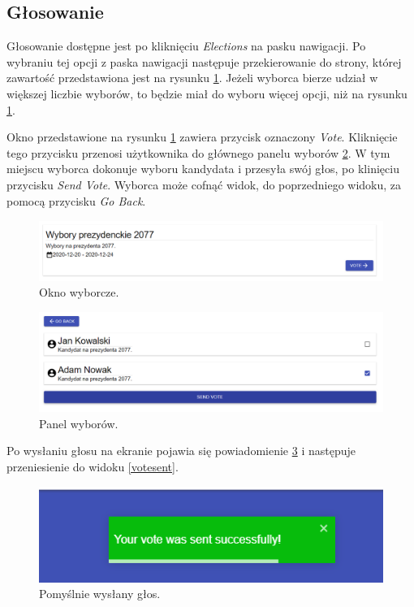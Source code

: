 \documentclass[a4paper,12pt]{book}
\begin{document}
\newpage

\subsection{Głosowanie}

Głosowanie dostępne jest po kliknięciu \textit{Elections} na pasku nawigacji. Po wybraniu tej opcji z paska nawigacji następuje przekierowanie do strony, której zawartość przedstawiona jest na rysunku \ref{electionwindow}. Jeżeli wyborca bierze udział w większej liczbie wyborów, to będzie miał do wyboru więcej opcji, niż na rysunku \ref{electionwindow}.

Okno  przedstawione na rysunku \ref{electionwindow} zawiera przycisk oznaczony \textit{Vote}. Kliknięcie tego przycisku przenosi użytkownika do głównego panelu wyborów \ref{votescreen}. W tym miejscu wyborca dokonuje wyboru kandydata i przesyła swój głos, po klinięciu przycisku \textit{Send Vote}. Wyborca może cofnąć widok, do poprzedniego widoku, za pomocą przycisku \textit{Go Back}.

\begin{figure}[H]
	\centering
	\includegraphics[width=\textwidth]{images/electionwindow.png}
	\caption{Okno wyborcze.}\label{electionwindow}
\end {figure}

\begin{figure}[H]
	\centering
	\includegraphics[width=\textwidth]{images/votescreen.png}
	\caption{Panel wyborów.}\label{votescreen}
\end {figure}

Po wysłaniu głosu na ekranie pojawia się powiadomienie \ref{votesuccess} i następuje przeniesienie do widoku \ref{votesent}.

\begin{figure}[H]
	\centering
	\includegraphics{images/votesuccess.png}
	\caption{Pomyślnie wysłany głos.}\label{votesuccess}
\end {figure}
\end{document}
